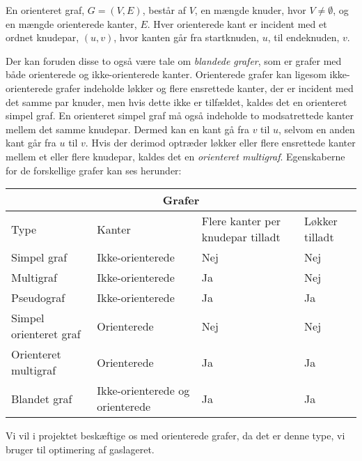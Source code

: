 \begin{defn}  
En orienteret graf, $G=(V,E)$, består af $V$, en mængde knuder, hvor $V \neq \emptyset$, og en mængde orienterede kanter, $E$. Hver orienterede kant er incident med et ordnet knudepar, $(u,v)$, hvor kanten går fra startknuden, $u$, til endeknuden, $v$. 
\end{defn}



Der kan foruden disse to også være tale om \emph{blandede grafer}, som er grafer med både orienterede og ikke-orienterede kanter. Orienterede grafer kan ligesom ikke-orienterede grafer indeholde løkker og flere ensrettede kanter, der er incident med det samme par knuder, men hvis dette ikke er tilfældet, kaldes det en orienteret simpel graf. En orienteret simpel graf må også indeholde to modsatrettede kanter mellem det samme knudepar. Dermed kan en kant gå fra $v$ til $u$, selvom en anden kant går fra $u$ til $v$. Hvis der derimod optræder løkker eller flere ensrettede kanter mellem et eller flere knudepar, kaldes det en \emph{orienteret multigraf}.  
Egenskaberne for de forskellige grafer kan ses herunder:


\begin{center} \label{tab:typer}
\begin{tabular}{ |p{4cm}|p{3cm}|p{3cm}|p{2cm}|  }
 \hline
 \multicolumn{4}{|c|}{Grafer} \\
 \hline
 Type & Kanter & Flere kanter per knudepar tilladt & Løkker tilladt\\
 \hline
 Simpel graf   & Ikke-orienterede    & Nej &   Nej\\
 Multigraf &   Ikke-orienterede & Ja   & Nej\\
 Pseudograf & Ikke-orienterede & Ja &  Ja\\
 Simpel orienteret graf    & Orienterede & Nej &  Nej\\
 Orienteret multigraf &  Orienterede  & Ja & Ja\\
 Blandet graf & Ikke-orienterede og orienterede  & Ja   & Ja\\
 \hline
\end{tabular}
\end{center}

%

Vi vil i projektet beskæftige os med orienterede grafer, da det er denne type, vi bruger til optimering af gaslageret. 
